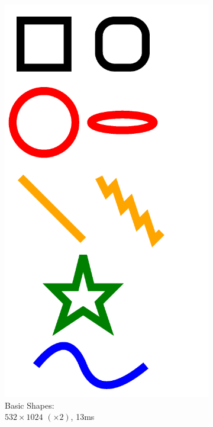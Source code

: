 \documentclass[UTF8]{ctexart}
\begin{document}
\begin{figure}[H]
\begin{subfigure}[b]{0.3\textwidth}
        \includegraphics[width=\textwidth]{images/Basic Shapes-532x1024-x2-13ms.png}
        \caption{Basic Shapes: \\$532 \times 1024$ $(\times 2)$, 13ms}
    \end{subfigure}
    \hfill
    \begin{subfigure}[b]{0.6\textwidth}

\end{subfigure}
\end{figure}
\end{document}
